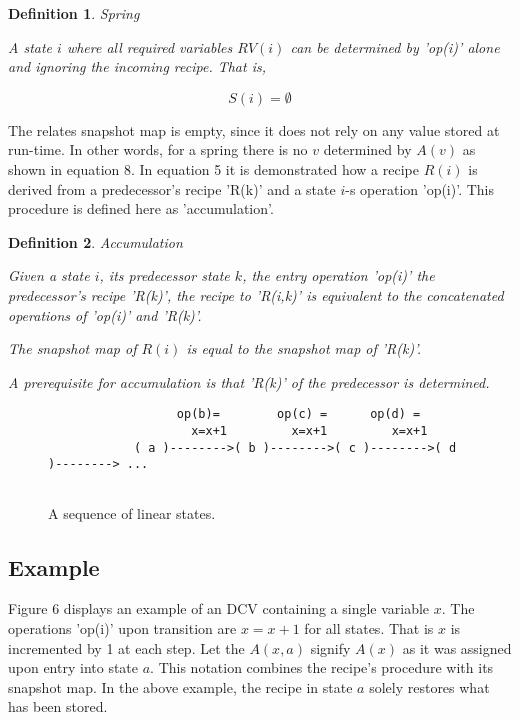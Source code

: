 \documentclass[12pt,a4paper]{scrartcl}
\theoremstyle{break}
\newtheorem{definition}{Definition}
\begin{document}
\begin{definition}
Spring

A state $i$ where all required variables $RV(i)$ can be determined by 
'op(i)' alone and ignoring the incoming recipe. That is, 
\end{definition}

\begin{equation}
                          S(i) = \emptyset
\end{equation}

The relates snapshot map is empty, since it does not rely on any value stored
at run-time.  In other words, for a spring there is no $v$ determined by $A(v)$
as shown in equation 8.  In equation 5 it is demonstrated how a recipe $R(i)$
is derived from a predecessor's recipe 'R(k)' and a state $i$-s operation
'op(i)'. This procedure is defined here as 'accumulation'.

\begin{definition}
Accumulation

Given a state $i$, its predecessor state $k$, the entry operation 'op(i)'
the predecessor's recipe 'R(k)', the recipe to 'R(i,k)' is equivalent
to the concatenated operations of 'op(i)' and 'R(k)'.

The snapshot map of $R(i)$ is equal to the snapshot map of 'R(k)'.

A prerequisite for accumulation is that 'R(k)' of the predecessor is 
determined.
\end{definition}

\begin{figure}[htbp] \leavevmode
\begin{verbatim}
                  op(b)=        op(c) =      op(d) =
                    x=x+1         x=x+1         x=x+1        
            ( a )-------->( b )-------->( c )-------->( d )--------> ...


\end{verbatim}
\caption{A sequence of linear states.}
\end{figure}

\subsection{Example}

Figure 6 displays an example of an DCV containing a single variable $x$. The
operations 'op(i)' upon transition are $x=x+1$ for all states. That is $x$ is
incremented by 1 at each step. Let the $A(x,a)$ signify $A(x)$ as it was
assigned upon entry into state $a$. This notation combines the recipe's
procedure with its snapshot map. In the above example, the recipe in state $a$
solely restores what has been stored.
\end{document}
